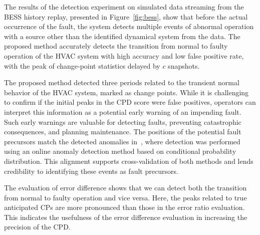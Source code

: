 The results of the detection experiment on simulated data streaming from the BESS history replay, presented in Figure~\ref{fig:bess}, show that before the actual occurrence of the fault, the system detects multiple events of abnormal operation with a source other than the identified dynamical system from the data. The proposed method accurately detects the transition from normal to faulty operation of the HVAC system with high accuracy and low false positive rate, with the peak of change-point statistics delayed by \(c\) snapshots.

The proposed method detected three periods related to the transient normal behavior of the HVAC system, marked as change points. While it is challenging to confirm if the initial peaks in the CPD score were false positives, operators can interpret this information as a potential early warning of an impending fault. Such early warnings are valuable for detecting faults, preventing catastrophic consequences, and planning maintenance. The positions of the potential fault precursors match the detected anomalies in~\citet{Wadinger2024}, where detection was performed using an online anomaly detection method based on conditional probability distribution. This alignment supports cross-validation of both methods and lends credibility to identifying these events as fault precursors.

The evaluation of error difference shows that we can detect both the transition from normal to faulty operation and vice versa. Here, the peaks related to true anticipated CPs are more pronounced than those in the error ratio evaluation. This indicates the usefulness of the error difference evaluation in increasing the precision of the CPD.

